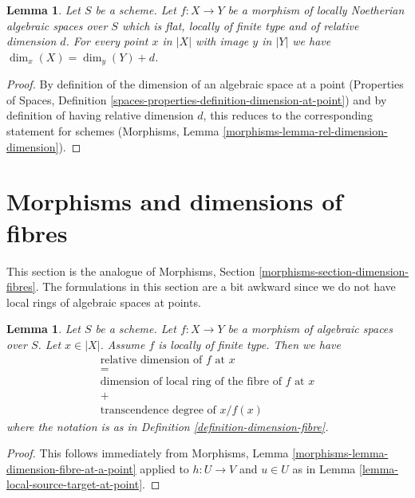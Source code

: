 \documentclass{stacks-project}
\theoremstyle{plain}
\newtheorem{lemma}[subsection]{Lemma}
\theoremstyle{definition}
\theoremstyle{remark}
\numberwithin{equation}{subsection}
\begin{document}
\begin{lemma}
\label{lemma-rel-dimension-dimension}
Let $S$ be a scheme. Let $f : X \to Y$ be a morphism of locally Noetherian
algebraic spaces over $S$ which is flat, locally of finite type and of
relative dimension $d$. For every point $x$ in $|X|$ with image
$y$ in $|Y|$ we have $\dim_x(X) = \dim_y(Y) + d$.
\end{lemma}

\begin{proof}
By definition of the dimension of an algebraic space
at a point (Properties of Spaces, Definition
\ref{spaces-properties-definition-dimension-at-point})
and by definition of having relative dimension $d$,
this reduces to the corresponding statement for schemes
(Morphisms, Lemma \ref{morphisms-lemma-rel-dimension-dimension}).
\end{proof}







\section{Morphisms and dimensions of fibres}
\label{section-dimension-fibres}

\noindent
This section is the analogue of
Morphisms, Section \ref{morphisms-section-dimension-fibres}.
The formulations in this section are a bit awkward since
we do not have local rings of algebraic spaces at points.

\begin{lemma}
\label{lemma-dimension-fibre-at-a-point}
Let $S$ be a scheme.
Let $f : X \to Y$ be a morphism of algebraic spaces over $S$.
Let $x \in |X|$.
Assume $f$ is locally of finite type.
Then we have
$$
\begin{matrix}
\text{relative dimension of }f\text{ at }x \\
= \\
\text{dimension of local ring of the fibre of }f\text{ at }x \\
+ \\
\text{transcendence degree of }x/f(x)
\end{matrix}
$$
where the notation is as in
Definition \ref{definition-dimension-fibre}.
\end{lemma}

\begin{proof}
This follows immediately from
Morphisms, Lemma \ref{morphisms-lemma-dimension-fibre-at-a-point}
applied to $h : U \to V$ and $u \in U$
as in
Lemma \ref{lemma-local-source-target-at-point}.
\end{proof}
\end{document}
